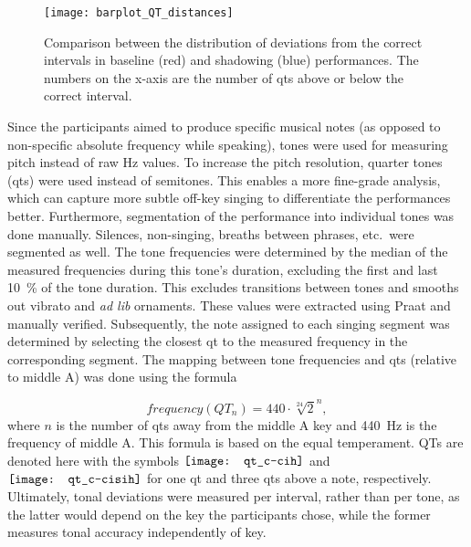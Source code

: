 \begin{figure}[t]
	\centering
	\texttt{[image: barplot\_QT\_distances]}
	\caption[Distribution of interval deviations]
	{Comparison between the distribution of deviations from the correct intervals in baseline (red) and shadowing (blue) performances.
		The numbers on the x-axis are the number of \acp{qt} above or below the correct interval.}
	\label{fig:barplot_QT_distances}
\end{figure}

Since the participants aimed to produce specific musical notes (as opposed to non-specific absolute frequency while speaking), tones were used for measuring pitch instead of raw \si{\hertz} values.
To increase the pitch resolution, quarter tones (\acp{qt}) were used instead of semitones.
This enables a more fine-grade analysis, which can capture more subtle off-key singing to differentiate the performances better.
Furthermore, segmentation of the performance into individual tones was done manually.
Silences, non-singing, breaths between phrases, etc.\ were segmented as well.
The tone frequencies were determined by the median of the measured frequencies during this tone's duration, excluding the first and last \SI{10}{\percent} of the tone duration.
This excludes transitions between tones and smooths out vibrato and \textit{ad lib} ornaments.
These values were extracted using Praat \citep{Boersma2001praat} and manually verified.
Subsequently, the note assigned to each singing segment was determined by selecting the closest \ac{qt} to the measured frequency in the corresponding segment.
The mapping between tone frequencies and \acp{qt} (relative to middle A) was done using the formula

\begin{equation}
	\label{eq:quarter_tones_formula}
	frequency(QT_n) = 440 \cdot \sqrt[24]{2}^n,
\end{equation}
\noindent
%
where $n$ is the number of \acp{qt} away from the middle A key \citep[cf.][]{DeKlerk1979equal} and \SI{440}{\hertz} is the frequency of middle A.
This formula is based on the equal temperament.
QTs are denoted here with the symbols \hspace{-0.18cm}
$\vcenter{\hbox{\texttt{[image: qt\_c-cih]}}}$ and 
$\vcenter{\hbox{\texttt{[image: qt\_c-cisih]}}}$ for one \ac{qt} and three \acp{qt} above a note, respectively.
Ultimately, tonal deviations were measured per interval, rather than per tone, as the latter would depend on the key the participants chose, while the former measures tonal accuracy independently of key.

